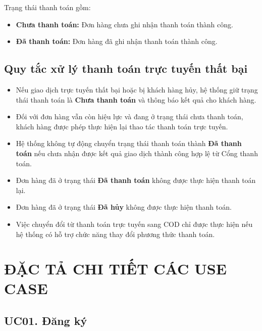 \documentclass[12pt,a4paper]{article}
\begin{document}
Trạng thái thanh toán gồm:

\begin{itemize}
    \item \textbf{Chưa thanh toán:} Đơn hàng chưa ghi nhận thanh toán thành công.
    \item \textbf{Đã thanh toán:} Đơn hàng đã ghi nhận thanh toán thành công.
\end{itemize}

\subsection*{Quy tắc xử lý thanh toán trực tuyến thất bại}

\begin{itemize}
    \item Nếu giao dịch trực tuyến thất bại hoặc bị khách hàng hủy, hệ thống giữ trạng thái thanh toán là \textbf{Chưa thanh toán} và thông báo kết quả cho khách hàng.

    \item Đối với đơn hàng vẫn còn hiệu lực và đang ở trạng thái chưa thanh toán, khách hàng được phép thực hiện lại thao tác thanh toán trực tuyến.

    \item Hệ thống không tự động chuyển trạng thái thanh toán thành \textbf{Đã thanh toán} nếu chưa nhận được kết quả giao dịch thành công hợp lệ từ Cổng thanh toán.

    \item Đơn hàng đã ở trạng thái \textbf{Đã thanh toán} không được thực hiện thanh toán lại.

    \item Đơn hàng đã ở trạng thái \textbf{Đã hủy} không được thực hiện thanh toán.

    \item Việc chuyển đổi từ thanh toán trực tuyến sang COD chỉ được thực hiện nếu hệ thống có hỗ trợ chức năng thay đổi phương thức thanh toán.
\end{itemize}

\section{ĐẶC TẢ CHI TIẾT CÁC USE CASE}


\subsection*{UC01. Đăng ký}
\end{document}
